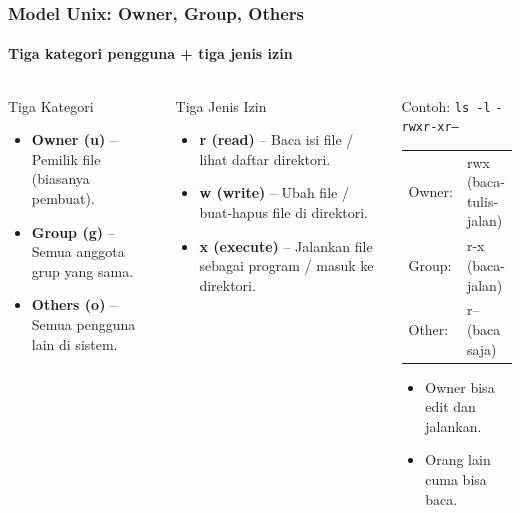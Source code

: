 \documentclass[t,aspectratio=169,xcolor=dvipsnames]{beamer}
\begin{document}
\begin{frame}[shrink=5]
    \frametitle{Model Unix: Owner, Group, Others}
    \framesubtitle{Tiga kategori pengguna + tiga jenis izin}

    \begin{columns}[T]
        \begin{block}{Tiga Kategori}
            \small
            \begin{itemize}
                \item \textbf{Owner (u)} -- Pemilik file (biasanya pembuat).
                \item \textbf{Group (g)} -- Semua anggota grup yang sama.
                \item \textbf{Others (o)} -- Semua pengguna lain di sistem.
            \end{itemize}
        \end{block}

        \vspace{0.15cm}
        \begin{block}{Tiga Jenis Izin}
            \small
            \begin{itemize}
                \item \textbf{r (read)} -- Baca isi file / lihat daftar direktori.
                \item \textbf{w (write)} -- Ubah file / buat-hapus file di direktori.
                \item \textbf{x (execute)} -- Jalankan file sebagai program / masuk ke direktori.
            \end{itemize}
        \end{block}

        \begin{exampleblock}{Contoh: \texttt{ls -l}}
            \small
            \texttt{-rwxr-xr--} \\
            \vspace{0.1cm}
            \begin{tabular}{ll}
                Owner: & rwx (baca-tulis-jalan) \\
                Group: & r-x (baca-jalan) \\
                Other: & r-- (baca saja) \\
            \end{tabular}
            \vspace{0.2cm}
            \begin{itemize}
                \item[$\to$] Owner bisa edit dan jalankan.
                \item[$\to$] Orang lain cuma bisa baca.
            \end{itemize}
        \end{exampleblock}
    \end{columns}
\end{frame}
\end{document}
